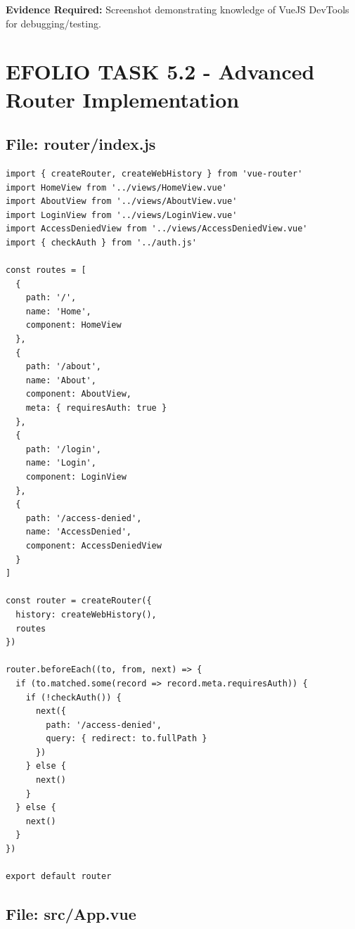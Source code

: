 \documentclass[11pt,a4paper]{article}
\begin{document}
\textbf{Evidence Required:} Screenshot demonstrating knowledge of VueJS DevTools for debugging/testing.

\newpage


\section{EFOLIO TASK 5.2 - Advanced Router Implementation}

\subsection{File: router/index.js}

\begin{lstlisting}[caption=Router configuration with navigation guards]
import { createRouter, createWebHistory } from 'vue-router'
import HomeView from '../views/HomeView.vue'
import AboutView from '../views/AboutView.vue'
import LoginView from '../views/LoginView.vue'
import AccessDeniedView from '../views/AccessDeniedView.vue'
import { checkAuth } from '../auth.js'

const routes = [
  {
    path: '/',
    name: 'Home',
    component: HomeView
  },
  {
    path: '/about',
    name: 'About',
    component: AboutView,
    meta: { requiresAuth: true }
  },
  {
    path: '/login',
    name: 'Login',
    component: LoginView
  },
  {
    path: '/access-denied',
    name: 'AccessDenied',
    component: AccessDeniedView
  }
]

const router = createRouter({
  history: createWebHistory(),
  routes
})

router.beforeEach((to, from, next) => {
  if (to.matched.some(record => record.meta.requiresAuth)) {
    if (!checkAuth()) {
      next({
        path: '/access-denied',
        query: { redirect: to.fullPath }
      })
    } else {
      next()
    }
  } else {
    next()
  }
})

export default router
\end{lstlisting}

\newpage

\subsection{File: src/App.vue}
\end{document}
